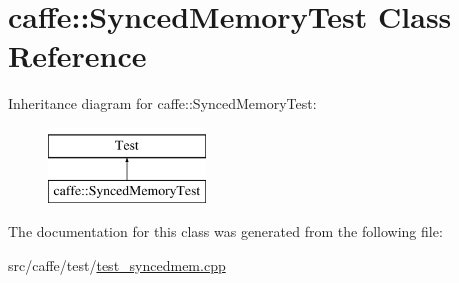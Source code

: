 \hypertarget{classcaffe_1_1_synced_memory_test}{\section{caffe\+:\+:Synced\+Memory\+Test Class Reference}
\label{classcaffe_1_1_synced_memory_test}
}
Inheritance diagram for caffe\+:\+:Synced\+Memory\+Test\+:\begin{figure}[H]
\begin{center}
\leavevmode
\includegraphics[height=2.000000cm]{classcaffe_1_1_synced_memory_test}
\end{center}
\end{figure}


The documentation for this class was generated from the following file\+:\begin{DoxyCompactItemize}
\item 
src/caffe/test/\hyperlink{test__syncedmem_8cpp}{test\+\_\+syncedmem.\+cpp}\end{DoxyCompactItemize}
